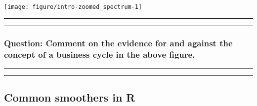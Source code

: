 \documentclass[]{article}
\newenvironment{Shaded}{\begin{snugshade}}{\end{snugshade}}
\newcommand{\KeywordTok}[1]{\textcolor[rgb]{0.13,0.29,0.53}{\textbf{#1}}}
\newcommand{\DataTypeTok}[1]{\textcolor[rgb]{0.13,0.29,0.53}{#1}}
\newcommand{\DecValTok}[1]{\textcolor[rgb]{0.00,0.00,0.81}{#1}}
\newcommand{\FloatTok}[1]{\textcolor[rgb]{0.00,0.00,0.81}{#1}}
\newcommand{\StringTok}[1]{\textcolor[rgb]{0.31,0.60,0.02}{#1}}
\newcommand{\OtherTok}[1]{\textcolor[rgb]{0.56,0.35,0.01}{#1}}
\newcommand{\OperatorTok}[1]{\textcolor[rgb]{0.81,0.36,0.00}{\textbf{#1}}}
\newcommand{\NormalTok}[1]{#1}
\begin{document}
\begin{Shaded}
\end{Shaded}

\begin{center}\texttt{[image: figure/intro-zoomed\_spectrum-1]} \end{center}

\begin{center}\rule{0.5\linewidth}{\linethickness}\end{center}

\begin{center}\rule{0.5\linewidth}{\linethickness}\end{center}

\subsubsection{Question: Comment on the evidence for and against the
concept of a business cycle in the above
figure.}\label{question-comment-on-the-evidence-for-and-against-the-concept-of-a-business-cycle-in-the-above-figure.}

\begin{center}\rule{0.5\linewidth}{\linethickness}\end{center}

\begin{center}\rule{0.5\linewidth}{\linethickness}\end{center}

\subsection{Common smoothers in R}\label{common-smoothers-in-r}
\end{document}
